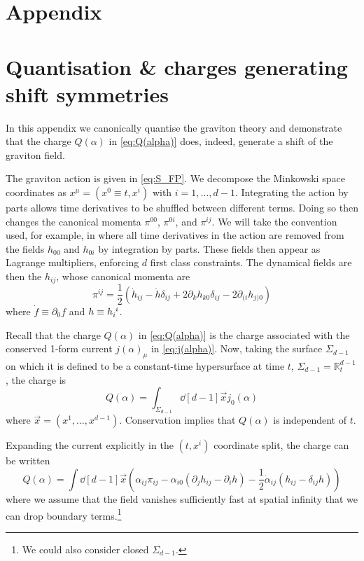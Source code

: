 \section*{Appendix}

\section{Quantisation \& charges generating shift symmetries}
\label{app:quantisation}

In this appendix we canonically quantise the graviton theory and demonstrate that the charge $Q(\alpha)$ in \eqref{eq:Q(alpha)} does, indeed, generate a shift of the graviton field. 

The graviton action is given in \eqref{eq:S_FP}. We decompose the Minkowski space coordinates as $x^\mu = (x^0\equiv t, x^i)$ with $i=1,\dots,d-1$. Integrating the action by parts allows time derivatives to be shuffled between different terms. Doing so then changes the canonical momenta $\pi^{00}$, $\pi^{0i}$, and $\pi^{ij}$. We will take the convention used, for example, in \cite{Hinterbichler:2011tt} where all time derivatives in the action are removed from the fields $h_{00}$ and $h_{0i}$ by integration by parts.
These fields then appear as Lagrange multipliers, enforcing $d$ first class constraints.
The dynamical fields are then the $h_{ij}$, whose canonical momenta are
\begin{equation}
    \pi^{ij} = \frac{1}{2} \left( \dot{h}_{ij} - \dot{h} \delta_{ij} + 2\partial_k h_{k0} \delta_{ij} - 2\partial_{(i} h_{j)0} \right)
\end{equation}
where $\dot{f} \equiv \partial_0 f$ and $h \equiv h\indices{_i^i}$. 

Recall that the charge $Q(\alpha)$ in \eqref{eq:Q(alpha)} is the charge associated with the conserved 1-form current $j(\alpha)_\mu$ in \eqref{eq:j(alpha)}. 
Now, taking the surface $\Sigma_{d-1}$ on which it is defined to be a constant-time hypersurface at time $t$, $\Sigma_{d-1} = \mathbb{R}^{d-1}_t$, the charge is
\begin{equation}
    Q(\alpha) = \int_{\Sigma_{d-1}} \dd[d-1]{\vec{x}} j_0(\alpha)
\end{equation}
where $\vec{x} = (x^1,\dots,x^{d-1})$.
Conservation implies that $Q(\alpha)$ is independent of $t$.

Expanding the current explicitly in the $(t,x^i)$ coordinate split, the charge can be written
\begin{equation}
    Q(\alpha) = \int \dd[d-1]{\vec{x}} \left( \alpha_{ij} \pi_{ij} - \alpha_{i0} \left( \partial_j h_{ij} - \partial_i h \right) - \frac{1}{2} \dot{\alpha}_{ij} \left( h_{ij} - \delta_{ij} h \right) \right)
\end{equation}
where we assume that the field vanishes sufficiently fast at spatial infinity that we can drop boundary terms.\footnote{We could also consider closed $\Sigma_{d-1}$.}


